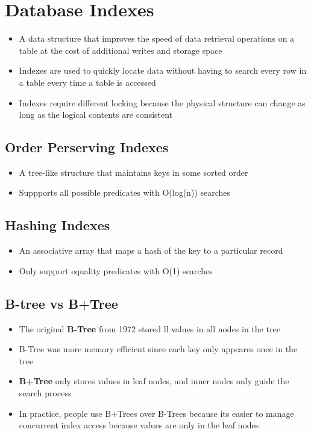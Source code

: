 \documentclass[11pt]{article}
\begin{document}
\maketitle
\thispagestyle{plain}

\section{Database Indexes}
\begin{itemize}
    \item A data structure that improves the speed of data retrieval operations on a table at the cost of additional writes and storage space
    \item Indexes are used to quickly locate data without having to search every row in a table every time a table is accessed
    \item Indexes require different locking because the physical structure can change as long as the logical contents are consistent
\end{itemize}

    \subsection*{Order Perserving Indexes}
    \begin{itemize}
        \item A tree-like structure that maintains keys in some sorted order
        \item Suppports all possible predicates with O(log(n)) searches
    \end{itemize}

\subsection*{Hashing Indexes}
    \begin{itemize}
        \item An associative array that maps a hash of the key to a particular record
        \item Only support equality predicates with O(1) searches
    \end{itemize}

\subsection*{B-tree vs B+Tree}
    \begin{itemize}
        \item The original \textbf{B-Tree} from 1972 stored ll values in all nodes in the tree
        \item B-Tree was more memory efficient since each key only appeares once in the tree
        \item \textbf{B+Tree} only stores values in leaf nodes, and inner nodes only guide the search process
        \item In practice, people use B+Trees over B-Trees because its easier to manage concurrent index access because values are only in the leaf nodes
    \end{itemize}
\end{document}
